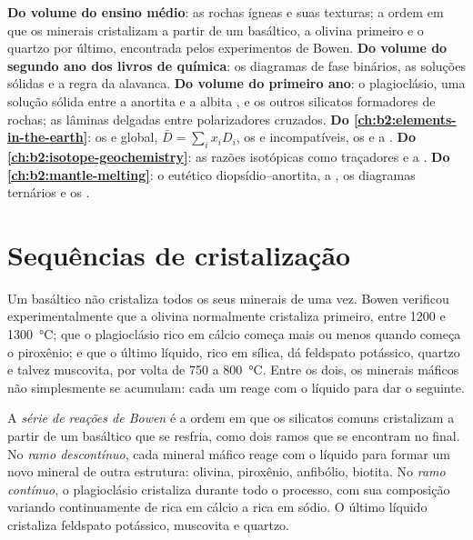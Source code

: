 \begin{recall}
\textbf{Do volume do ensino médio}: as rochas ígneas e suas texturas; a ordem
em que os minerais cristalizam a partir de um  basáltico, a olivina primeiro e o quartzo por último,
encontrada pelos experimentos de Bowen. \textbf{Do volume do segundo ano dos livros de química}:
os diagramas de fase binários, as soluções sólidas e a regra da alavanca. \textbf{Do volume do primeiro
ano}: o plagioclásio, uma solução sólida entre a anortita  e a albita
, e os outros silicatos formadores de rochas; as lâminas delgadas entre polarizadores
cruzados. \textbf{Do \cref{ch:b2:elements-in-the-earth}}: os  e
global, $\bar D = \sum_i x_i D_i$, os  e incompatíveis,
os  e a . \textbf{Do
\cref{ch:b2:isotope-geochemistry}}: as razões isotópicas como traçadores e a . \textbf{Do \cref{ch:b2:mantle-melting}}: o eutético diopsídio--anortita,
a , os diagramas ternários e os .
\end{recall}

\section{Sequências de cristalização}\label{sec:b2:magmatic-differentiation:sequences}

Um  basáltico não cristaliza todos os seus minerais de uma vez. Bowen verificou
experimentalmente que a olivina normalmente cristaliza primeiro, entre 1200 e
\qty{1300}{\celsius}; que o plagioclásio rico em cálcio começa mais ou menos quando começa o piroxênio;
e que o último líquido, rico em sílica, dá feldspato potássico, quartzo e
talvez muscovita, por volta de 750 a \qty{800}{\celsius}. Entre os dois, os minerais
máficos não simplesmente se acumulam: cada um reage com o líquido para dar o seguinte.

\begin{definition}\label{def:b2:magmatic-differentiation:bowen}
A \emph{série de reações de Bowen} é a ordem em que
os silicatos comuns cristalizam a partir de um  basáltico que se resfria, como dois ramos
que se encontram no final. No \emph{ramo descontínuo}, cada mineral máfico
reage com o líquido para formar um novo mineral de outra estrutura: olivina,
piroxênio, anfibólio, biotita. No \emph{ramo contínuo}, o plagioclásio
cristaliza durante todo o processo, com sua composição variando continuamente de rica em cálcio
a rica em sódio. O último líquido cristaliza feldspato potássico, muscovita e
quartzo.
\end{definition}

